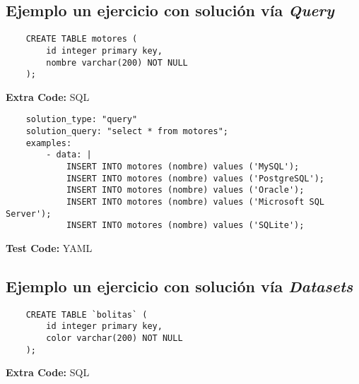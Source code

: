 
\subsection{Ejemplo un ejercicio con solución vía \textit{Query}}


\begin{listing}[ht]
    \begin{verbatim}
    CREATE TABLE motores (
        id integer primary key,
        nombre varchar(200) NOT NULL
    );
    \end{verbatim}
    \caption{\textbf{Extra Code:} SQL}
    \label{listing:yaml}
\end{listing}

\begin{listing}[ht]
    \begin{verbatim}
    solution_type: "query"
    solution_query: "select * from motores";
    examples:
        - data: |
            INSERT INTO motores (nombre) values ('MySQL');
            INSERT INTO motores (nombre) values ('PostgreSQL');
            INSERT INTO motores (nombre) values ('Oracle');
            INSERT INTO motores (nombre) values ('Microsoft SQL Server');
            INSERT INTO motores (nombre) values ('SQLite');
    \end{verbatim}
    \caption{\textbf{Test Code:} YAML}
    \label{listing:yaml}
\end{listing}

\clearpage
\subsection{Ejemplo un ejercicio con solución vía \textit{Datasets}}


\begin{listing}[ht]
    \begin{verbatim}
    CREATE TABLE `bolitas` (
        id integer primary key,
        color varchar(200) NOT NULL
    );
    \end{verbatim}
    \caption{\textbf{Extra Code:} SQL}
    \label{listing:yaml}
\end{listing}

